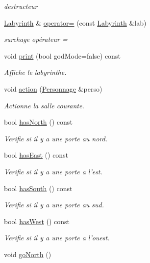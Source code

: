 \begin{DoxyCompactItemize}
\begin{DoxyCompactList}\small\item\em destructeur \end{DoxyCompactList}\item 
\hyperlink{class_labyrinth}{Labyrinth} \& \hyperlink{class_labyrinth_a1c84c73db11482be6b04e35bdb97c28f}{operator=} (const \hyperlink{class_labyrinth}{Labyrinth} \&lab)
\begin{DoxyCompactList}\small\item\em surchage opérateur = \end{DoxyCompactList}\item 
void \hyperlink{class_labyrinth_a7c0789decac44992b6baa12613b9109a}{print} (bool god\-Mode=false) const 
\begin{DoxyCompactList}\small\item\em Affiche le labyrinthe. \end{DoxyCompactList}\item 
void \hyperlink{class_labyrinth_a80514a0f6bc2a3a3e68a607ea51a800e}{action} (\hyperlink{class_personnage}{Personnage} \&perso)
\begin{DoxyCompactList}\small\item\em Actionne la salle courante. \end{DoxyCompactList}\item 
bool \hyperlink{class_labyrinth_ab22fb393c8f6d844096ce6548dff2164}{has\-North} () const 
\begin{DoxyCompactList}\small\item\em Verifie si il y a une porte au nord. \end{DoxyCompactList}\item 
bool \hyperlink{class_labyrinth_aa0008c659d5e512f805ddaff2620912c}{has\-East} () const 
\begin{DoxyCompactList}\small\item\em Verifie si il y a une porte a l'est. \end{DoxyCompactList}\item 
bool \hyperlink{class_labyrinth_adeb5d81ef6beccdb0360e3c5bdab9f51}{has\-South} () const 
\begin{DoxyCompactList}\small\item\em Verifie si il y a une porte au sud. \end{DoxyCompactList}\item 
bool \hyperlink{class_labyrinth_ae5ffa83a10d415f1f635a58bc25254ba}{has\-West} () const 
\begin{DoxyCompactList}\small\item\em Verifie si il y a une porte a l'ouest. \end{DoxyCompactList}\item 
\hypertarget{class_labyrinth_a6759f031dd720443786e52d946d3b95a}{void \hyperlink{class_labyrinth_a6759f031dd720443786e52d946d3b95a}{go\-North} ()}\label{class_labyrinth_a6759f031dd720443786e52d946d3b95a}


\end{DoxyCompactItemize}
